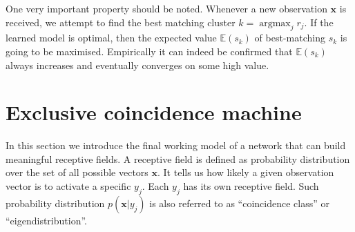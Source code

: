 \documentclass[12pt]{article}
\DeclareMathOperator*{\argmax}{argmax}
\begin{document}
One very important property should be noted. Whenever a new observation $\boldsymbol{x}$ is received, we attempt to find the best matching cluster $k=\argmax_j r_j$. If the learned model is optimal, then the expected value $\mathbb{E}(s_k)$ of best-matching $s_k$ is going to be maximised. Empirically it can indeed be confirmed that $\mathbb{E}(s_k)$ always increases and eventually converges on some high value.




\section{Exclusive coincidence machine}

In this section we introduce the final working model of a network that can build meaningful receptive fields. A receptive field is defined as probability distribution over the set of all possible vectors $\boldsymbol{x}$. It tells us how likely a given observation vector is to activate a specific $y_j$. Each $y_j$ has its own receptive field. Such probability distribution $p(\boldsymbol{x}|y_j)$ is also referred to as ``coincidence class'' or ``eigendistribution''. 
\end{document}
